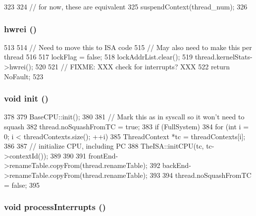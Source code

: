 \begin{DoxyCode}
323 {
324     // for now, these are equivalent
325     suspendContext(thread_num);
326 }
\end{DoxyCode}
\hypertarget{classOzoneCPU_a5f42e07ae335dff417664e91518c7f1e}{
\subsubsection[{hwrei}]{ hwrei ()}}
\label{classOzoneCPU_a5f42e07ae335dff417664e91518c7f1e}



\begin{DoxyCode}
513 {
514     // Need to move this to ISA code
515     // May also need to make this per thread
516 
517     lockFlag = false;
518     lockAddrList.clear();
519     thread.kernelStats->hwrei();
520 
521     // FIXME: XXX check for interrupts? XXX
522     return NoFault;
523 }
\end{DoxyCode}
\hypertarget{classOzoneCPU_a02fd73d861ef2e4aabb38c0c9ff82947}{
\subsubsection[{init}]{\setlength{\rightskip}{0pt plus 5cm}void init ()}}
\label{classOzoneCPU_a02fd73d861ef2e4aabb38c0c9ff82947}



\begin{DoxyCode}
378 {
379     BaseCPU::init();
380 
381     // Mark this as in syscall so it won't need to squash
382     thread.noSquashFromTC = true;
383     if (FullSystem) {
384         for (int i = 0; i < threadContexts.size(); ++i) {
385             ThreadContext *tc = threadContexts[i];
386 
387             // initialize CPU, including PC
388             TheISA::initCPU(tc, tc->contextId());
389         }
390     }
391     frontEnd->renameTable.copyFrom(thread.renameTable);
392     backEnd->renameTable.copyFrom(thread.renameTable);
393 
394     thread.noSquashFromTC = false;
395 }
\end{DoxyCode}
\hypertarget{classOzoneCPU_a45387b6e4a00dd0948cb94c3abfa06f3}{
\subsubsection[{processInterrupts}]{\setlength{\rightskip}{0pt plus 5cm}void processInterrupts ()}}
\label{classOzoneCPU_a45387b6e4a00dd0948cb94c3abfa06f3}



